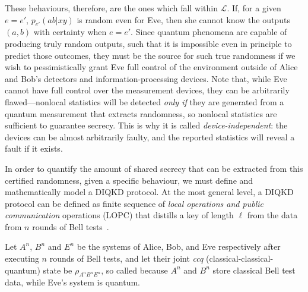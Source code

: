 \documentclass[10pt, a4paper]{article}
\numberwithin{equation}{section} %
\theoremstyle{definition}
\theoremstyle{plain}
\newcommand{\?}{\mathrel{?}} %
\newcommand{\Ls}{\mathcal{L}}
\begin{document}
    These behaviours, therefore, are the ones which fall within \(\Ls\). If, for a given \(e = e'\), \(p_{e'}(ab|xy)\) is random even for Eve, then she cannot know the outputs \((a,b)\) with certainty when \(e=e'\). Since quantum phenomena are capable of producing truly random outputs, such that it is impossible even in principle to predict those outcomes, they must be the source for such true randomness if we wish to pessimistically grant Eve full control of the environment outside of Alice and Bob's detectors and information-processing devices. Note that, while Eve cannot have full control over the measurement devices, they can be arbitrarily flawed---nonlocal statistics will be detected \emph{only if} they are generated from a quantum measurement that extracts randomness, so nonlocal statistics are sufficient to guarantee secrecy. This is why it is called \emph{device-independent}: the devices can be almost arbitrarily faulty, and the reported statistics will reveal a fault if it exists.

    In order to quantify the amount of shared secrecy that can be extracted from this certified randomness, given a specific behaviour, we must define and mathematically model a DIQKD protocol. At the most general level, a DIQKD protocol can be defined as finite sequence of \emph{local operations and public communication} operations (LOPC) that distills a key of length \(\ell\) from the data from \(n\) rounds of Bell tests~\cite{DIQKD_Limits}.

    Let \(A^n\), \(B^n\) and \(E^n\) be the systems of Alice, Bob, and Eve respectively after executing \(n\) rounds of Bell tests, and let their joint \emph{ccq} (classical-classical-quantum) state be \(\rho_{A^n B^n E^n}\), so called because \(A^n\) and \(B^n\) store classical Bell test data, while Eve's system is quantum.
\end{document}
